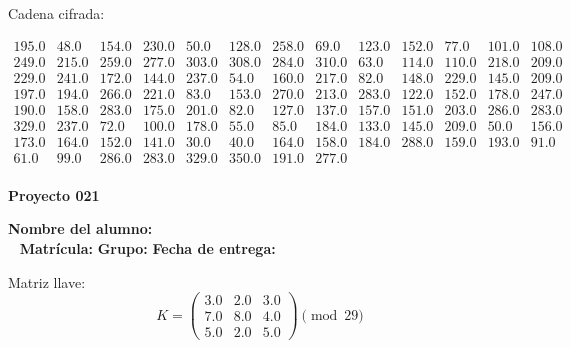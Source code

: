 \documentclass[12pt]{article}
\begin{document}
Cadena cifrada:
\begin{center}
$\begin{array}{lllllllllllll}
195.0 & 48.0 & 154.0 & 230.0 & 50.0 & 128.0 & 258.0 & 69.0 & 123.0 & 152.0 & 77.0 & 101.0 & 108.0\\
249.0 & 215.0 & 259.0 & 277.0 & 303.0 & 308.0 & 284.0 & 310.0 & 63.0 & 114.0 & 110.0 & 218.0 & 209.0\\
229.0 & 241.0 & 172.0 & 144.0 & 237.0 & 54.0 & 160.0 & 217.0 & 82.0 & 148.0 & 229.0 & 145.0 & 209.0\\
197.0 & 194.0 & 266.0 & 221.0 & 83.0 & 153.0 & 270.0 & 213.0 & 283.0 & 122.0 & 152.0 & 178.0 & 247.0\\
190.0 & 158.0 & 283.0 & 175.0 & 201.0 & 82.0 & 127.0 & 137.0 & 157.0 & 151.0 & 203.0 & 286.0 & 283.0\\
329.0 & 237.0 & 72.0 & 100.0 & 178.0 & 55.0 & 85.0 & 184.0 & 133.0 & 145.0 & 209.0 & 50.0 & 156.0\\
173.0 & 164.0 & 152.0 & 141.0 & 30.0 & 40.0 & 164.0 & 158.0 & 184.0 & 288.0 & 159.0 & 193.0 & 91.0\\
61.0 & 99.0 & 286.0 & 283.0 & 329.0 & 350.0 & 191.0 & 277.0\\
\end{array}$
\end{center}

\newpage


\textbf{Proyecto 021}

\textbf{Nombre del alumno:} \underline{\hspace{13cm}}\\\
\vspace{1cm}
\textbf{Matrícula:} \underline{\hspace{4cm}} \hspace{1cm}
\textbf{Grupo:} \underline{\hspace{2cm}}
\textbf{Fecha de entrega:} \underline{\hspace{2cm}}

\medskip

Matriz llave:
\[
K = \begin{pmatrix}
3.0 & 2.0 & 3.0\\
7.0 & 8.0 & 4.0\\
5.0 & 2.0 & 5.0
\end{pmatrix} \pmod{29}
\]
\end{document}
